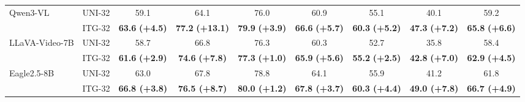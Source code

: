 \begin{table}[h]
{\begin{tabular}{ll|c|c|ccc|c|c}
\midrule
\multirow{2}{*}{Qwen3-VL} & UNI-32 & 59.1 & 64.1 & 76.0 & 60.9 & 55.1 & 40.1 & 59.2 \\
& ITG-32  & \cellcolor[HTML]{DAEFF9} \textbf{63.6} \textbf{(+4.5)} & \cellcolor[HTML]{DAEFF9} \textbf{77.2} \textbf{(+13.1)} & \cellcolor[HTML]{DAEFF9} \textbf{79.9} \textbf{(+3.9)} & \cellcolor[HTML]{DAEFF9} \textbf{66.6} \textbf{(+5.7)} & \cellcolor[HTML]{DAEFF9} \textbf{60.3} \textbf{(+5.2)} & \cellcolor[HTML]{DAEFF9} \textbf{47.3} \textbf{(+7.2)} & \cellcolor[HTML]{DAEFF9} \textbf{65.8} \textbf{(+6.6)} \\
\midrule
\multirow{2}{*}{LLaVA-Video-7B} & UNI-32 & 58.7 & 66.8 & 76.3 & 60.3 & 52.7 & 35.8 & 58.4 \\
& ITG-32  & \cellcolor[HTML]{DAEFF9} \textbf{61.6} \textbf{(+2.9)} & \cellcolor[HTML]{DAEFF9} \textbf{74.6} \textbf{(+7.8)} & \cellcolor[HTML]{DAEFF9} \textbf{77.3} \textbf{(+1.0)} & \cellcolor[HTML]{DAEFF9} \textbf{65.9} \textbf{(+5.6)} & \cellcolor[HTML]{DAEFF9} \textbf{55.2} \textbf{(+2.5)} & \cellcolor[HTML]{DAEFF9} \textbf{42.8} \textbf{(+7.0)} & \cellcolor[HTML]{DAEFF9} \textbf{62.9} \textbf{(+4.5)} \\
\midrule
\multirow{2}{*}{Eagle2.5-8B} & UNI-32 & 63.0 & 67.8 & 78.8 & 64.1 & 55.9 & 41.2 & 61.8 \\
& ITG-32  & \cellcolor[HTML]{DAEFF9} \textbf{66.8 (+3.8)} & \cellcolor[HTML]{DAEFF9} \textbf{76.5 (+8.7)} & \cellcolor[HTML]{DAEFF9} \textbf{80.0 (+1.2)} & \cellcolor[HTML]{DAEFF9} \textbf{67.8 (+3.7)} & \cellcolor[HTML]{DAEFF9} \textbf{60.3 (+4.4)} & \cellcolor[HTML]{DAEFF9} \textbf{49.0 (+7.8)} & 
\cellcolor[HTML]{DAEFF9} \textbf{66.7 (+4.9)} \\
\bottomrule
\end{tabular}}
\label{tab:video}
\vspace{-2mm}
\end{table}



